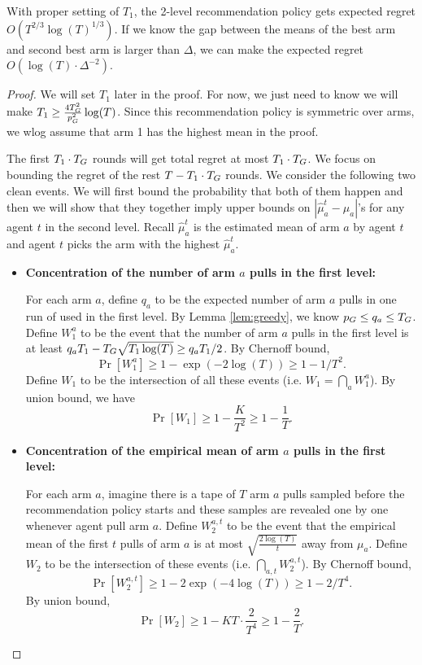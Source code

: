 \begin{theorem}
\label{thm:2level}
With proper setting of $T_1$, the 2-level recommendation policy gets expected regret $O(T^{2/3} \log(T)^{1/3})$. If we know the gap between the means of the best arm and second best arm is larger than $\Delta$, we can make the expected regret $O(\log(T) \cdot \Delta^{-2})$. 
\end{theorem}

\begin{proof}
We will set $T_1$ later in the proof. For now, we just need to know we will make $T_1 \geq \frac{4T_G^2}{p_G^2}\log(T)$. Since this recommendation policy is symmetric over arms, we wlog assume that arm 1 has the highest mean in the proof.

The first $T_1 \cdot T_G$ rounds will get total regret at most $T_1 \cdot T_G$.  We focus on bounding the regret of the rest $T - T_1 \cdot T_G$ rounds. We consider the following two clean events. We will first bound the probability that both of them happen and then we will show that they together imply upper bounds on $|\hat{\mu}^t_a - \mu_a|$'s for any agent $t$ in the second level. Recall $\hat{\mu}^t_a$ is the estimated mean of arm $a$ by agent $t$ and agent $t$ picks the arm with the highest $\hat{\mu}^t_a$.

\begin{itemize}
\item \textbf{Concentration of the number of arm $a$ pulls in the first level:} 

For each arm $a$, define $q_a$ to be the expected number of arm $a$ pulls in one run of \ALGG used in the first level. By Lemma \ref{lem:greedy}, we know $p_G \leq q_a \leq T_G$. Define $W_1^a$ to be the event that the number of arm $a$ pulls in the first level is at least $q_a T_1- T_G \sqrt{T_1\log(T)} \geq q_a T_1 / 2$. By Chernoff bound,
\[
\Pr[W_1^a] \geq 1-\exp(-2\log(T)) \geq 1-1/T^2.
\]
Define $W_1$ to be the intersection of all these events (i.e. $W_1 = \bigcap_{a}W_1^a$). By union bound, we have
\[
\Pr[W_1] \geq 1- \frac{K}{T^2} \geq 1 - \frac{1}{T}.
\]
\item  \textbf{Concentration of the empirical mean of arm $a$ pulls in the first level:}

For each arm $a$, imagine there is a tape of $T$ arm $a$ pulls sampled before the recommendation policy starts and these samples are revealed one by one whenever agent pull arm $a$. Define $W^{a,t}_2$ to be the event that the empirical mean of the first $t$ pulls of arm $a$ is at most $\sqrt{\frac{2\log(T)}{t}}$ away from $\mu_a$. Define $W_2$ to be the intersection of these events (i.e. $\bigcap_{a,t} W^{a,t}_2$).
By Chernoff bound,
\[
\Pr[W^{a,t}_2] \geq 1 - 2\exp(-4\log(T)) \geq 1-2/T^4.
\]
By union bound, 
\[
\Pr[W_2] \geq 1 - KT \cdot \frac{2}{T^4} \geq 1 - \frac{2}{T}.
\]
\end{itemize}


\end{proof}
